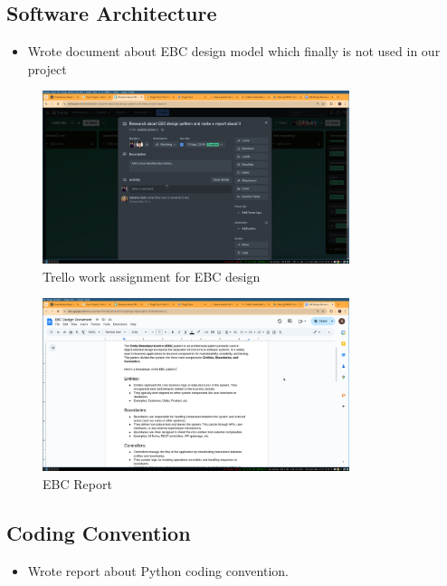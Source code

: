 \documentclass[a4paper,12pt]{article}
\begin{document}
\subsection{Software Architecture}
\begin{itemize}
    \item Wrote document about EBC design model which finally is not used in our project
\end{itemize}
\begin{figure}[H]
    \centering
    \includegraphics[width=0.8\textwidth]{images/trello_ebc.png}
    \caption{Trello work assignment for EBC design}
    \label{fig:ebcdesignreport}
\end{figure}


\begin{figure}[H]
    \centering
    \includegraphics[width=0.8\textwidth]{images/ebc_report.png}
    \caption{EBC Report}
    \label{fig:ebc}
\end{figure}


\subsection{Coding Convention}
\begin{itemize}
    \item Wrote report about Python coding convention.
\end{itemize}
\end{document}

